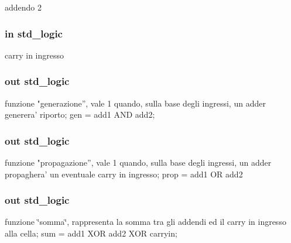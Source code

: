 addendo 2 

\hypertarget{group___base_cell_gaa556a73dc4a4de1a0d662b25adbcbe33}{
\subsubsection[{carryin}]{ {\bfseries \textcolor{vhdlchar}{in}\textcolor{vhdlchar}{ }} {\bfseries \textcolor{vhdlchar}{std\+\_\+logic}\textcolor{vhdlchar}{ }} \hspace{0.3cm}{\ttfamily [Port]}}}\label{group___base_cell_gaa556a73dc4a4de1a0d662b25adbcbe33}


carry in ingresso 

\hypertarget{group___base_cell_gaad65a9c9ebd4dd83c2835249a1ba2dff}{
\subsubsection[{gen}]{ {\bfseries \textcolor{vhdlchar}{out}\textcolor{vhdlchar}{ }} {\bfseries \textcolor{vhdlchar}{std\+\_\+logic}\textcolor{vhdlchar}{ }} \hspace{0.3cm}{\ttfamily [Port]}}}\label{group___base_cell_gaad65a9c9ebd4dd83c2835249a1ba2dff}


funzione "generazione”, vale 1 quando, sulla base degli ingressi, un adder generera' riporto; gen = add1 A\+N\+D add2; 

\hypertarget{group___base_cell_gac94466f3a0e3e34f0231abcf4b667ade}{
\subsubsection[{prop}]{ {\bfseries \textcolor{vhdlchar}{out}\textcolor{vhdlchar}{ }} {\bfseries \textcolor{vhdlchar}{std\+\_\+logic}\textcolor{vhdlchar}{ }} \hspace{0.3cm}{\ttfamily [Port]}}}\label{group___base_cell_gac94466f3a0e3e34f0231abcf4b667ade}


funzione "propagazione”, vale 1 quando, sulla base degli ingressi, un adder propaghera' un eventuale carry in ingresso; prop = add1 O\+R add2 

\hypertarget{group___base_cell_ga0d9fc1b21b42422b12d68ad73ca8ef13}{
\subsubsection[{sum}]{ {\bfseries \textcolor{vhdlchar}{out}\textcolor{vhdlchar}{ }} {\bfseries \textcolor{vhdlchar}{std\+\_\+logic}\textcolor{vhdlchar}{ }} \hspace{0.3cm}{\ttfamily [Port]}}}\label{group___base_cell_ga0d9fc1b21b42422b12d68ad73ca8ef13}


funzione \char`\"{}somma\char`\"{}, rappresenta la somma tra gli addendi ed il carry in ingresso alla cella; sum = add1 X\+O\+R add2 X\+O\+R carryin; 

